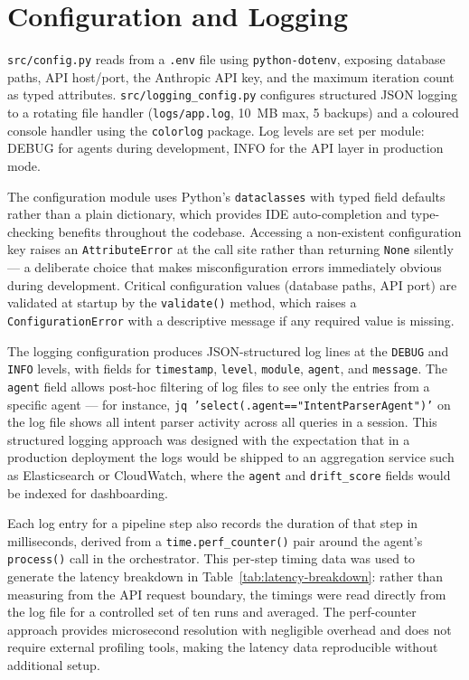\documentclass[12pt,a4paper]{report}
\begin{document}
\section{Configuration and Logging}
\label{sec:config-impl}

\texttt{src/config.py} reads from a \texttt{.env} file using \texttt{python-dotenv}, exposing database paths, \ac{API} host/port, the Anthropic \ac{API} key, and the maximum iteration count as typed attributes. \texttt{src/logging\_config.py} configures structured JSON logging to a rotating file handler (\texttt{logs/app.log}, 10~MB max, 5 backups) and a coloured console handler using the \texttt{colorlog} package. Log levels are set per module: DEBUG for agents during development, INFO for the \ac{API} layer in production mode.

The configuration module uses Python's \texttt{dataclasses} with typed field defaults rather than a plain dictionary, which provides IDE auto-completion and type-checking benefits throughout the codebase. Accessing a non-existent configuration key raises an \texttt{AttributeError} at the call site rather than returning \texttt{None} silently — a deliberate choice that makes misconfiguration errors immediately obvious during development. Critical configuration values (database paths, API port) are validated at startup by the \texttt{validate()} method, which raises a \texttt{ConfigurationError} with a descriptive message if any required value is missing.

The logging configuration produces JSON-structured log lines at the \texttt{DEBUG} and \texttt{INFO} levels, with fields for \texttt{timestamp}, \texttt{level}, \texttt{module}, \texttt{agent}, and \texttt{message}. The \texttt{agent} field allows post-hoc filtering of log files to see only the entries from a specific agent — for instance, \texttt{jq 'select(.agent=="IntentParserAgent")'} on the log file shows all intent parser activity across all queries in a session. This structured logging approach was designed with the expectation that in a production deployment the logs would be shipped to an aggregation service such as Elasticsearch or CloudWatch, where the \texttt{agent} and \texttt{drift\_score} fields would be indexed for dashboarding.

Each log entry for a pipeline step also records the duration of that step in milliseconds, derived from a \texttt{time.perf\_counter()} pair around the agent's \texttt{process()} call in the orchestrator. This per-step timing data was used to generate the latency breakdown in Table~\ref{tab:latency-breakdown}: rather than measuring from the API request boundary, the timings were read directly from the log file for a controlled set of ten runs and averaged. The perf-counter approach provides microsecond resolution with negligible overhead and does not require external profiling tools, making the latency data reproducible without additional setup.
\end{document}
